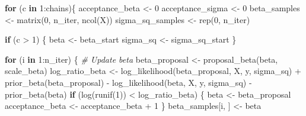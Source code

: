 \documentclass[
  letterpaper,
]{krantz}
\newenvironment{Shaded}{}{}
\newcommand{\CommentTok}[1]{\textcolor[rgb]{0.38,0.63,0.69}{\textit{#1}}}
\newcommand{\ControlFlowTok}[1]{\textcolor[rgb]{0.00,0.44,0.13}{\textbf{#1}}}
\newcommand{\DecValTok}[1]{\textcolor[rgb]{0.25,0.63,0.44}{#1}}
\newcommand{\FunctionTok}[1]{\textcolor[rgb]{0.02,0.16,0.49}{#1}}
\newcommand{\NormalTok}[1]{#1}
\newcommand{\OtherTok}[1]{\textcolor[rgb]{0.00,0.44,0.13}{#1}}
\newcommand{\SpecialCharTok}[1]{\textcolor[rgb]{0.25,0.44,0.63}{#1}}
\begin{document}
\begin{Shaded}
\begin{Highlighting}[]
    \ControlFlowTok{for}\NormalTok{ (c }\ControlFlowTok{in} \DecValTok{1}\SpecialCharTok{:}\NormalTok{chains)\{}
\NormalTok{        acceptance\_beta }\OtherTok{\textless{}{-}} \DecValTok{0}
\NormalTok{        acceptance\_sigma }\OtherTok{\textless{}{-}} \DecValTok{0}
\NormalTok{        beta\_samples }\OtherTok{\textless{}{-}} \FunctionTok{matrix}\NormalTok{(}\DecValTok{0}\NormalTok{, n\_iter, }\FunctionTok{ncol}\NormalTok{(X))}
\NormalTok{        sigma\_sq\_samples }\OtherTok{\textless{}{-}} \FunctionTok{rep}\NormalTok{(}\DecValTok{0}\NormalTok{, n\_iter)}

        \ControlFlowTok{if}\NormalTok{ (c }\SpecialCharTok{\textgreater{}} \DecValTok{1}\NormalTok{) \{}
\NormalTok{            beta }\OtherTok{\textless{}{-}}\NormalTok{ beta\_start}
\NormalTok{            sigma\_sq }\OtherTok{\textless{}{-}}\NormalTok{ sigma\_sq\_start}
\NormalTok{        \}       }

        \ControlFlowTok{for}\NormalTok{ (i }\ControlFlowTok{in} \DecValTok{1}\SpecialCharTok{:}\NormalTok{n\_iter) \{}
            \CommentTok{\# Update beta}
\NormalTok{            beta\_proposal }\OtherTok{\textless{}{-}} \FunctionTok{proposal\_beta}\NormalTok{(beta, scale\_beta)}
\NormalTok{            log\_ratio\_beta }\OtherTok{\textless{}{-}} \FunctionTok{log\_likelihood}\NormalTok{(beta\_proposal, X, y, sigma\_sq) }\SpecialCharTok{+} \FunctionTok{prior\_beta}\NormalTok{(beta\_proposal) }\SpecialCharTok{{-}}
                \FunctionTok{log\_likelihood}\NormalTok{(beta, X, y, sigma\_sq) }\SpecialCharTok{{-}} \FunctionTok{prior\_beta}\NormalTok{(beta)}
            \ControlFlowTok{if}\NormalTok{ (}\FunctionTok{log}\NormalTok{(}\FunctionTok{runif}\NormalTok{(}\DecValTok{1}\NormalTok{)) }\SpecialCharTok{\textless{}}\NormalTok{ log\_ratio\_beta) \{}
\NormalTok{                beta }\OtherTok{\textless{}{-}}\NormalTok{ beta\_proposal}
\NormalTok{                acceptance\_beta }\OtherTok{\textless{}{-}}\NormalTok{ acceptance\_beta }\SpecialCharTok{+} \DecValTok{1}
\NormalTok{            \}}
\NormalTok{            beta\_samples[i, ] }\OtherTok{\textless{}{-}}\NormalTok{ beta}


\end{Highlighting}
\end{Shaded}
\end{document}

